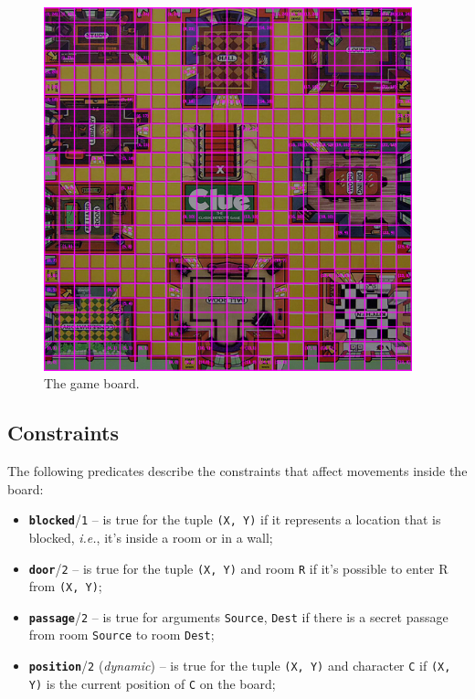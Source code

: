 \documentclass[12pt,a4paper]{article}
\newcommand{\varname}[1]{\texttt{#1}}
\newcommand{\varnamebf}[1]{\textbf{\texttt{#1}}}
\newcommand{\predprot}[2]{{\color{MidnightBlue}\varnamebf{#1}}/{\color{Mulberry}\varname{#2}}}
\begin{document}
\begin{figure}[H]
	\centering
	\includegraphics[width=0.95\textwidth]{board-grid.png}
	\caption{The game board.}
	\label{fig:board-grid}
\end{figure}

\subsection{Constraints}

The following predicates describe the constraints that affect movements inside the board:
\begin{itemize}
    \item \predprot{blocked}{1} -- is true for the tuple \varname{(X, Y)} if it represents a location that is blocked, \textit{i.e.}, it's inside a room or in a wall;
    
    \item \predprot{door}{2} -- is true for the tuple \varname{(X, Y)} and room \varname{R} if it's possible to enter R from \varname{(X, Y)};
    
    \item \predprot{passage}{2} -- is true for arguments \varname{Source}, \varname{Dest} if there is a secret passage from room \varname{Source} to room \varname{Dest};
    
    \item \predprot{position}{2} (\textit{dynamic}) -- is true for the tuple \varname{(X, Y)} and character \varname{C} if \varname{(X, Y)} is the current position of \varname{C} on the board;
\end{itemize}
\end{document}
